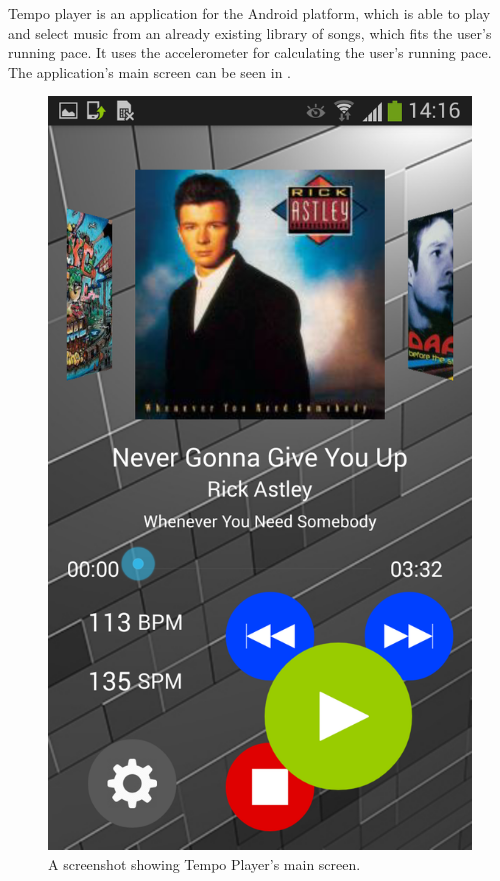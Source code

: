 Tempo player is an application for the Android platform, which is able to play and select music from an already existing library of songs, which fits the user's running pace. It uses the accelerometer for calculating the user's running pace. The application's main screen can be seen in . 

\begin{figure}[h!]
  \centering
    \includegraphics[scale=0.2]{Images/Screenshots/mainScreen.png}
  \caption{A screenshot showing Tempo Player's main screen.}
  \label{fig:mainScreen}
\end{figure}

